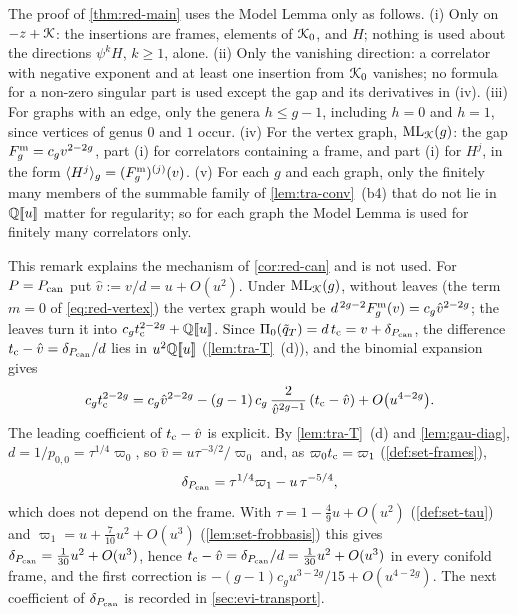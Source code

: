 \begin{rmk}
\label{rmk:red-hyp}
The proof of \cref{thm:red-main} uses the Model Lemma only as follows. (i) Only on $-z+\mathcal{K}$: the insertions are frames, elements of $\mathcal{K}_{0}$, and $H$; nothing is used about the directions $\psi^kH$, $k\geq 1$, alone. (ii) Only the vanishing direction: a correlator with negative exponent and at least one insertion from $\mathcal{K}_{0}$ vanishes; no formula for a non-zero singular part is used except the gap and its derivatives in (iv). (iii) For graphs with an edge, only the genera $h\leq g-1$, including $h = 0$ and $h = 1$, since vertices of genus $0$ and $1$ occur. (iv) For the vertex graph, $\mathrm{ML}_{\mathcal{K}}(g)$: the gap $F^{\mathrm{m}}_g = c_gv^{2-2g}$, part (i) for correlators containing a frame, and part (i) for $H^j$, in the form $\langle H^j\rangle_g = (F^{\mathrm{m}}_g)^{(j)}(v)$. (v) For each $g$ and each graph, only the finitely many members of the summable family of \cref{lem:tra-conv}~(b4) that do not lie in $\mathbb{Q}[\![ u ]\!]$ matter for regularity; so for each graph the Model Lemma is used for finitely many correlators only.
\end{rmk}

\begin{rmk}
\label{rmk:red-leaf}
This remark explains the mechanism of \cref{cor:red-can} and is not used. For $P = P_{\mathrm{can}}$ put $\hat v := v/d = u+O(u^2)$. Under $\mathrm{ML}_{\mathcal{K}}(g)$, without leaves (the term $m = 0$ of \eqref{eq:red-vertex}) the vertex graph would be $d^{\,2g-2}F^{\mathrm{m}}_g(v) = c_g\hat v^{2-2g}$; the leaves turn it into $c_gt_{\mathrm{c}}^{2-2g}+\mathbb{Q}[\![ u ]\!]$. Since $\Pi_0(\tilde q_T) = d\,t_{\mathrm{c}} = v+\delta_{P_{\mathrm{can}}}$, the difference $t_{\mathrm{c}}-\hat v = \delta_{P_{\mathrm{can}}}/d$ lies in $u^2\mathbb{Q}[\![ u ]\!]$ (\cref{lem:tra-T}~(d)), and the binomial expansion gives
\[
c_gt_{\mathrm{c}}^{2-2g} = c_g\hat v^{2-2g}-(g-1)\,c_g\,\frac{2}{\hat v^{2g-1}}\,(t_{\mathrm{c}}-\hat v)+O\bigl(u^{4-2g}\bigr).
\]
The leading coefficient of $t_{\mathrm{c}}-\hat v$ is explicit. By \cref{lem:tra-T}~(d) and \cref{lem:gau-diag}, $d = 1/p_{0,0} = \tau^{1/4}\varpi_0$, so $\hat v = u\tau^{-3/2}/\varpi_0$ and, as $\varpi_0t_{\mathrm{c}} = \varpi_1$ (\cref{def:set-frames}),
\[
\delta_{P_{\mathrm{can}}} = \tau^{1/4}\varpi_1-u\,\tau^{-5/4},
\]
which does not depend on the frame. With $\tau = 1-\frac49u+O(u^2)$ (\cref{def:set-tau}) and $\varpi_1 = u+\frac7{10}u^2+O(u^3)$ (\cref{lem:set-frobbasis}) this gives $\delta_{P_{\mathrm{can}}} = \frac1{30}u^2+O(u^3)$, hence $t_{\mathrm{c}}-\hat v = \delta_{P_{\mathrm{can}}}/d = \frac1{30}u^2+O(u^3)$ in every conifold frame, and the first correction is $-(g-1)c_gu^{3-2g}/15+O(u^{4-2g})$. The next coefficient of $\delta_{P_{\mathrm{can}}}$ is recorded in \cref{sec:evi-transport}.
\end{rmk}
